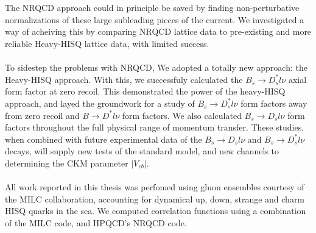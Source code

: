\\ \\
The NRQCD approach could in principle be saved by finding non-perturbative normalizations of these large subleading pieces of the current. We investigated a way of acheiving this by comparing NRQCD lattice data to pre-existing and more reliable Heavy-HISQ lattice data, with limited success.
\\ \\
To sidestep the problems with NRQCD, We adopted a totally new approach: the Heavy-HISQ approach. With this, we successfuly calculated the $B_s\to D_s^*l\nu$ axial form factor at zero recoil. This demonstrated the power of the heavy-HISQ approach, and layed the groundwork for a study of $B_s\to D_s^*l\nu$ form factors away from zero recoil and $B\to D^*l\nu$ form factors. We also calculated $B_s\to D_sl\nu$ form factors throughout the full physical range of momentum transfer. These studies, when combined with future experimental data of the $B_s\to D_sl\nu$ and $B_s\to D_s^*l\nu$ decays, will supply new tests of the standard model, and new channels to determining the CKM parameter $|V_{cb}|$.
\\ \\
All work reported in this thesis was perfomed using gluon ensembles courtesy of the MILC collaboration, accounting for dynamical up, down, strange and charm HISQ quarks in the sea. We computed correlation functions using a combination of the MILC code, and HPQCD's NRQCD code.
